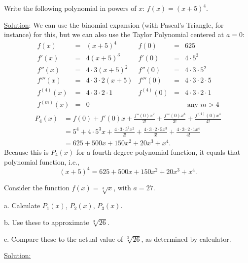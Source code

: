 \bex Write the following polynomial in powers of $x$:
$f(x)=(x+5)^4$.

\underline{Solution}: We can use the binomial expansion (with 
Pascal's Triangle, for instance) for this, but we can also use
the Taylor Polynomial centered at $a=0$:
$$\begin{array}{rclrcl}
f(x)&=&(x+5)^4\qquad&f(0)&=&625\\
f'(x)&=&4(x+5)^3& f'(0)&=&4\cdot5^3\\
f''(x)&=&4\cdot3(x+5)^2&f''(0)&=&4\cdot3\cdot5^2\\
f'''(x)&=&4\cdot3\cdot2(x+5)&f'''(0)&=&4\cdot3\cdot2\cdot5\\
f^{(4)}(x)&=&4\cdot3\cdot2\cdot1&f^{(4)}(0)&=&4\cdot3\cdot2\cdot1\\
f^{(m)}(x)&=&0&&&\text{ any }m>4 \end{array}$$ 
\begin{align*}
P_4(x)&=f(0)+f'(0)x+\frac{f''(0)x^2}{2!}+\frac{f'''(0)x^3}{3!}
           +\frac{f^{(4)}(0)x^4}{4!}\\
&=5^4+4\cdot5^3x+\frac{4\cdot3\cdot5^2x^2}{2!}
 +\frac{4\cdot3\cdot2\cdot5x^3}{3!}+\frac{4\cdot3\cdot2\cdot1x^4}{4!}\\
&=625+500x+150x^2+20x^3+x^4.\end{align*}
Because this is $P_4(x)$ for a fourth-degree polynomial function, 
it equals that polynomial function, i.e.,
$$(x+5)^4=625+500x+150x^2+20x^3+x^4.$$
\eex


\newpage
\bex
Consider the function $f(x)=\sqrt[3]{x}$, with $a=27$.
\begin{description}
\item a. Calculate $P_1(x)$, $P_2(x)$, $P_3(x)$.
\item b. Use these to approximate $\sqrt[3]{26}$.
\item c. Compare these to the actual value of $\sqrt[3]{26}$,
	as determined by calculator.
\end{description}

\underline{Solution:}  

